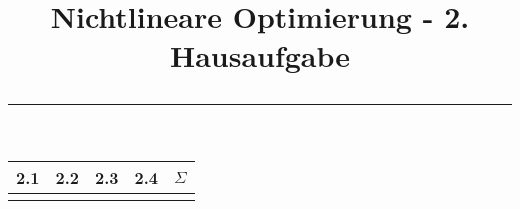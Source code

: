 \documentclass[11p,a4paper]{article}
\begin{document}
\title{\textbf{Nichtlineare Optimierung - 2. Hausaufgabe} \\ \rule{\textwidth}{1pt}}
\date{}

\clearpage\maketitle
\thispagestyle{empty}
\ourtitle
\setcounter{page}{0}


\vspace{2.5cm}
\begin{center}
\huge
\begin{tabular}{c*{3}{|c}||c}
2.1 & 2.2 & 2.3 & 2.4 & $\Sigma$ \\\hline
&&&& \\
\end{tabular}
\end{center}
\vspace{2cm}






%
\end{document}
